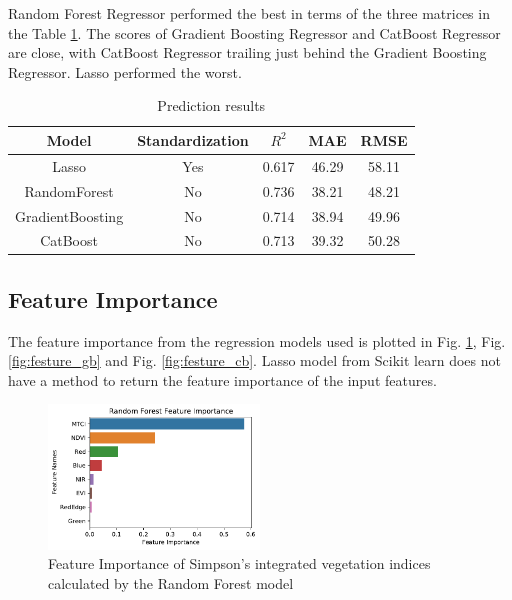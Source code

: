 \documentclass[sigconf, nonacm, natbib, screen, balance=False]{acmart}
\begin{document}
Random Forest Regressor performed the best in terms of the three matrices in the Table \ref{tab:results}. The scores of Gradient Boosting Regressor and CatBoost Regressor are close, with CatBoost Regressor trailing just behind the Gradient Boosting Regressor. Lasso performed the worst. 

\begin{table}[h!]
  \caption{Prediction results}
  \label{tab:results}
  \begin{tabular}{|c|c|c|c|c|}
    \hline

     \textbf{Model} & \textbf{Standardization} & \textbf{$R^2$} & \textbf{MAE} & \textbf{RMSE}  \\
    \hline

    Lasso & Yes & 0.617 & 46.29 & 58.11\\ \hline
    RandomForest & No & 0.736 & 38.21 & 48.21\\ \hline
    GradientBoosting & No & 0.714 & 38.94 & 49.96\\ \hline
    CatBoost & No & 0.713 & 39.32 & 50.28\\ \hline
  \end{tabular}
\end{table}

\subsection{Feature Importance}\label{sec:feat_imp}

The feature importance from the regression models used is plotted in Fig. \ref{fig:festure_rf}, Fig. \ref{fig:festure_gb} and Fig. \ref{fig:festure_cb}. Lasso model from Scikit learn does not have a method to return the feature importance of the input features.

\begin{figure}[!h]
   \hspace*{-0.25in}
   \includegraphics[width=0.5\textwidth, angle=0,]{feature_importance_RF.pdf}
  \caption{Feature Importance of Simpson's integrated vegetation indices calculated by the Random Forest model}
  \label{fig:festure_rf}
\end{figure}
\end{document}
